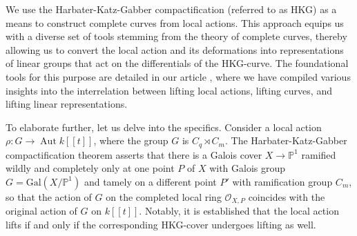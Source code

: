 \documentclass[11pt,letterpaper]{amsart}
\theoremstyle{definition}
\DeclareMathOperator\Aut{Aut}
\renewcommand{\O}{{\mathcal{O}}}
\begin{document}
We use the Harbater-Katz-Gabber compactification (referred to as HKG) as a means to construct complete curves from local actions. This approach equips us with a diverse set of tools stemming from the theory of complete curves, thereby allowing us to convert the local action and its deformations into representations of linear groups that act on the differentials of the HKG-curve. The foundational tools for this purpose are detailed in our article \cite{2101.11084}, where we have compiled various insights into the interrelation between lifting local actions, lifting curves, and lifting linear representations.
 

To elaborate further, let us delve into the specifics. Consider a local action $\rho: G \rightarrow \Aut k[[t]]$, where the group $G$ is $C_q \rtimes C_m$.
The Harbater-Katz-Gabber compactification theorem asserts that there is a Galois cover
$X\rightarrow \mathbb{P}^1$ ramified wildly and completely only at one point $P$ of $X$ with Galois group 
$G=\mathrm{Gal}(X/\mathbb{P}^1)$ 
and tamely on a different point $P'$ with ramification group $C_m$, so that the action of $G$ on the completed local ring $\O_{X,P}$ coincides with the original 
action of $G$ on $k[[t]]$. Notably, it is established that the local action lifts if and only if the corresponding HKG-cover undergoes lifting as well.
\end{document}
